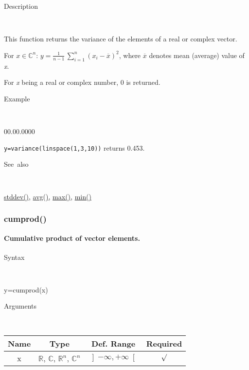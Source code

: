 \begin{description}
\item [Description]~
\end{description}
This function returns the variance of the elements of a real or complex
vector.

\medskip{}
For $x\in$$\mathbb{C}^{n}$: $y={\displaystyle \frac{1}{n-1}}\,$$\sum\limits _{i=1}^{n}\left(x_{i}-\overline{x}\right)^{2}$,
where $\overline{x}$ denotes mean (average) value of \textit{x}.
\medskip{}

For \textit{x} being a real or complex number, 0 is returned.

\begin{description}
\item [Example]~
\end{description}
\begin{lyxlist}{00.00.0000}
\item [\texttt{y=variance(linspace(1,3,10))}]returns 0.453.
\end{lyxlist}
\begin{description}
\item [See~also]~
\end{description}
\textcolor{blue}{\hyperlink{stddev}{stddev()}}\textcolor{black}{,}
\textcolor{blue}{\hyperlink{avg}{avg()}}\textcolor{black}{,} \textcolor{blue}{\hyperlink{max}{max()}}\textcolor{black}{,}
\textcolor{blue}{\hyperlink{min}{min()}}


\newpage
{}


\subsubsection*{\hypertarget{cumprod}{}{\Large cumprod()}}


\paragraph{\label{par:Cumulative-product}Cumulative product of vector elements.}

\begin{description}
\item [Syntax]~
\end{description}
y=cumprod(x)

\begin{description}
\item [Arguments]~
\end{description}
\begin{tabular}{|c|c|c|c|}
\hline 
Name&
Type&
Def. Range&
Required\tabularnewline
\hline
\hline 
x&
$\mathbb{R}$, $\mathbb{C}$, $\mathbb{R}^{n}$, $\mathbb{C}^{n}$&
$\left]-\infty,+\infty\right[$&
$\surd$\tabularnewline
\hline
\end{tabular}

